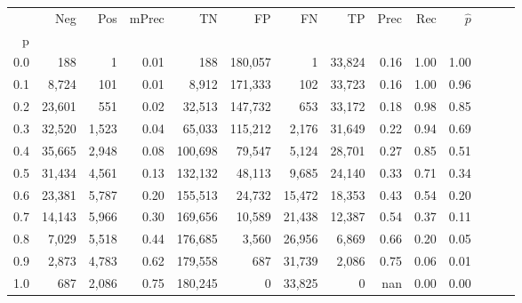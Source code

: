 \begin{tabular}{rrrrrrrrrrrrrr}
\toprule
{} &     Neg &    Pos & mPrec &       TN &       FP &      FN &      TP &  Prec &   Rec & $\hat{p}$ \\
p   &         &        &       &          &          &         &         &       &       &           \\
\midrule
0.0 &     188 &      1 &  0.01 &      188 &  180,057 &       1 &  33,824 &  0.16 &  1.00 &      1.00 \\
0.1 &   8,724 &    101 &  0.01 &    8,912 &  171,333 &     102 &  33,723 &  0.16 &  1.00 &      0.96 \\
0.2 &  23,601 &    551 &  0.02 &   32,513 &  147,732 &     653 &  33,172 &  0.18 &  0.98 &      0.85 \\
0.3 &  32,520 &  1,523 &  0.04 &   65,033 &  115,212 &   2,176 &  31,649 &  0.22 &  0.94 &      0.69 \\
0.4 &  35,665 &  2,948 &  0.08 &  100,698 &   79,547 &   5,124 &  28,701 &  0.27 &  0.85 &      0.51 \\
0.5 &  31,434 &  4,561 &  0.13 &  132,132 &   48,113 &   9,685 &  24,140 &  0.33 &  0.71 &      0.34 \\
0.6 &  23,381 &  5,787 &  0.20 &  155,513 &   24,732 &  15,472 &  18,353 &  0.43 &  0.54 &      0.20 \\
0.7 &  14,143 &  5,966 &  0.30 &  169,656 &   10,589 &  21,438 &  12,387 &  0.54 &  0.37 &      0.11 \\
0.8 &   7,029 &  5,518 &  0.44 &  176,685 &    3,560 &  26,956 &   6,869 &  0.66 &  0.20 &      0.05 \\
0.9 &   2,873 &  4,783 &  0.62 &  179,558 &      687 &  31,739 &   2,086 &  0.75 &  0.06 &      0.01 \\
1.0 &     687 &  2,086 &  0.75 &  180,245 &        0 &  33,825 &       0 &   nan &  0.00 &      0.00 \\
\bottomrule
\end{tabular}
